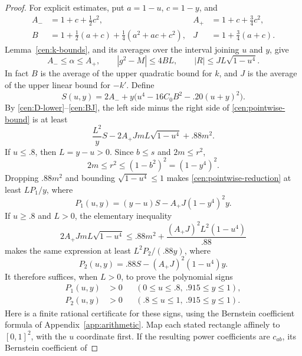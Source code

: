 \begin{proof}
For explicit estimates, put $a=1-u$, $c=1-y$, and
\begin{align*}
 A_-&=1+c+\tfrac12c^2,& A_+&=1+c+\tfrac34c^2,\\
 B&=1+\tfrac12(a+c)+\tfrac14(a^2+ac+c^2),&
 J&=1+\tfrac34(a+c).
\end{align*}
Lemma~\ref{cen:k-bounds}, and its averages over the interval joining
$u$ and $y$, give
\begin{equation}\label{cen:BJ}
 A_-\le\alpha\le A_+,\qquad
 |g^2-M|\le4BL,\qquad
 |R|\le J L\sqrt{1-u^4}.
\end{equation}
In fact $B$ is the average of the upper quadratic bound for $k$, and
$J$ is the average of the upper linear bound for $-k'$.
Define
\begin{equation}\label{cen:S}
 S(u,y)=2A_-+y\bigl(u^4-16C_0B^2-.20(u+y)^2\bigr).
\end{equation}
By \eqref{cen:D-lower}--\eqref{cen:BJ}, the left side minus the right
side of \eqref{cen:pointwise-bound} is at least
\begin{equation}\label{cen:pointwise-reduction}
 \frac{L^2}{y}S
 -2A_+JmL\sqrt{1-u^4}+.88m^2.
\end{equation}
If $u\le .8$, then $L=y-u>0$.  Since $b\le s$ and $2m\le r^2$,
\[
 2m\le r^2\le(1-b^2)^2=(1-y^4)^2.
\]
Dropping $.88m^2$ and bounding $\sqrt{1-u^4}\le1$ makes
\eqref{cen:pointwise-reduction} at least $LP_1/y$, where
\begin{equation}\label{cen:P1}
 P_1(u,y)=(y-u)S-A_+J(1-y^4)^2y.
\end{equation}
If $u\ge .8$ and $L>0$, the elementary inequality
\[
 2A_+JmL\sqrt{1-u^4}
 \le .88m^2+\frac{(A_+J)^2L^2(1-u^4)}{.88}
\]
makes the same expression at least $L^2P_2/(.88y)$, where
\begin{equation}\label{cen:P2}
 P_2(u,y)=.88S-(A_+J)^2(1-u^4)y.
\end{equation}
It therefore suffices, when $L>0$, to prove the polynomial signs
\begin{equation}\label{cen:polynomial-signs}
 \begin{aligned}
 P_1(u,y)&>0 &&(0\le u\le .8,\ .915\le y\le1),\\
 P_2(u,y)&>0 &&(.8\le u\le1,\ .915\le y\le1).
 \end{aligned}
\end{equation}
Here is a finite rational certificate for these signs, using the Bernstein
coefficient formula of Appendix~\ref{app:arithmetic}. Map each stated
rectangle affinely to $[0,1]^2$, with the $u$ coordinate first.  If the
resulting power coefficients are $c_{ab}$, its Bernstein coefficient of

\end{proof}
